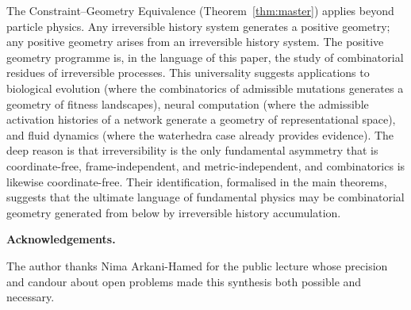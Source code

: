 \documentclass[11pt]{article}
\theoremstyle{plain}
\theoremstyle{definition}
\theoremstyle{remark}
\begin{document}
The Constraint--Geometry Equivalence (Theorem~\ref{thm:master}) applies beyond particle physics. Any irreversible history system generates a positive geometry; any positive geometry arises from an irreversible history system. The positive geometry programme is, in the language of this paper, the study of combinatorial residues of irreversible processes. This universality suggests applications to biological evolution (where the combinatorics of admissible mutations generates a geometry of fitness landscapes), neural computation (where the admissible activation histories of a network generate a geometry of representational space), and fluid dynamics (where the waterhedra case already provides evidence). The deep reason is that irreversibility is the only fundamental asymmetry that is coordinate-free, frame-independent, and metric-independent, and combinatorics is likewise coordinate-free. Their identification, formalised in the main theorems, suggests that the ultimate language of fundamental physics may be combinatorial geometry generated from below by irreversible history accumulation.

\bigskip\noindent\textbf{Acknowledgements.}

The author thanks Nima Arkani-Hamed for the public lecture whose precision and candour about open problems made this synthesis both possible and necessary.

\newpage


\end{document}
